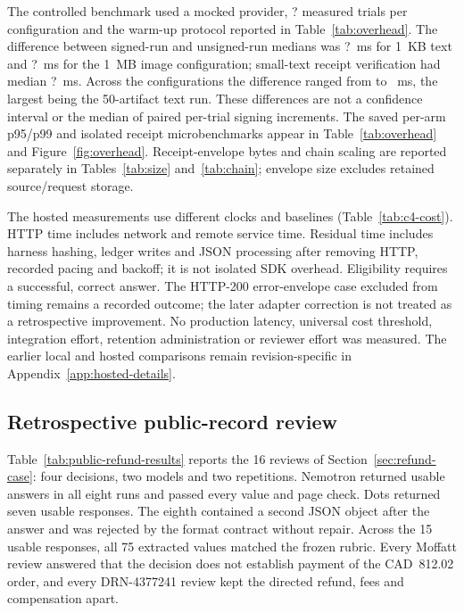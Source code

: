 \documentclass[11pt]{article}
\newcommand{\OverheadTrials}{?}
\newcommand{\SignDeltaSmallMs}{?}
\newcommand{\SignDeltaImageMs}{?}
\newcommand{\VerifySmallMs}{?}
\begin{document}
The controlled benchmark used a mocked provider, \OverheadTrials{} measured trials per configuration and the warm-up protocol reported in Table~\ref{tab:overhead}. The difference between signed-run and unsigned-run medians was \SignDeltaSmallMs{}~ms for 1~KB text and \SignDeltaImageMs{}~ms for the 1~MB image configuration; small-text receipt verification had median \VerifySmallMs{}~ms. Across the \CfourSignDeltaConfigs{} configurations the difference ranged from \CfourSignDeltaMinMs{} to \CfourSignDeltaMaxMs{}~ms, the largest being the 50-artifact text run. These differences are not a confidence interval or the median of paired per-trial signing increments. The saved per-arm p95/p99 and isolated receipt microbenchmarks appear in Table~\ref{tab:overhead} and Figure~\ref{fig:overhead}. Receipt-envelope bytes and chain scaling are reported separately in Tables~\ref{tab:size} and~\ref{tab:chain}; envelope size excludes retained source/request storage.

The hosted measurements use different clocks and baselines (Table~\ref{tab:c4-cost}). HTTP time includes network and remote service time. Residual time includes harness hashing, ledger writes and JSON processing after removing HTTP, recorded pacing and backoff; it is not isolated SDK overhead. Eligibility requires a successful, correct answer. The HTTP-200 error-envelope case excluded from timing remains a recorded outcome; the later adapter correction is not treated as a retrospective improvement. No production latency, universal cost threshold, integration effort, retention administration or reviewer effort was measured. The earlier local and hosted comparisons remain revision-specific in Appendix~\ref{app:hosted-details}.

\CfourCostTable
\FloatBarrier

\subsection{Retrospective public-record review}\label{sec:eval-public-refund}

Table~\ref{tab:public-refund-results} reports the 16 reviews of Section~\ref{sec:refund-case}: four decisions, two models and two repetitions. Nemotron returned usable answers in all eight runs and passed every value and page check. Dots returned seven usable responses. The eighth contained a second JSON object after the answer and was rejected by the format contract without repair. Across the 15 usable responses, all 75 extracted values matched the frozen rubric. Every Moffatt review answered that the decision does not establish payment of the CAD~812.02 order, and every DRN-4377241 review kept the directed refund, fees and compensation apart.
\end{document}
